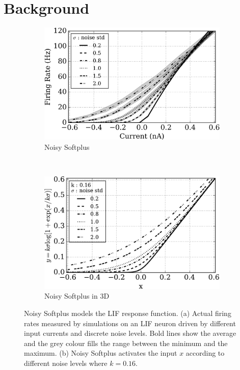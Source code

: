 \documentclass{article}
\begin{document}
\section{Background}
\label{sec:back}
\begin{figure}[thb!]
	\centering
	\begin{subfigure}[t]{0.4\textwidth}
		\includegraphics[width=\textwidth]{pics_iconip/siegert.png}
		\caption{Noisy Softplus}
	\end{subfigure}~~~~~~
	\begin{subfigure}[t]{0.4\textwidth}
		\includegraphics[width=\textwidth]{pics_iconip/4.pdf}
		\caption{Noisy Softplus in 3D}
	\end{subfigure}
	\caption{
		Noisy Softplus models the LIF response function.
		(a) Actual firing rates measured by simulations on an LIF neuron driven by different input currents and discrete noise levels.
		Bold lines show the average and the grey colour fills the range between the minimum and the maximum.
		(b) Noisy Softplus activates the input $x$ according to different noise levels where $k=0.16$.}
	\label{fig:ns}
\end{figure}
\end{document}
